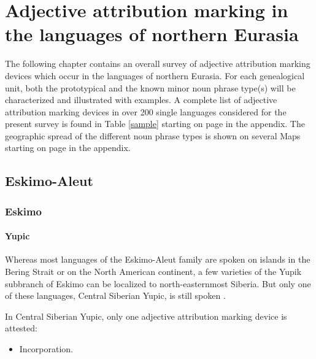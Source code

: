 
\chapter[The languages of northern Eurasia]{Adjective attribution marking in the languages of northern Eurasia}

The following chapter contains an overall survey of adjective attribution marking devices which occur in the languages of northern Eurasia. For each genealogical unit, both the prototypical and the known minor noun phrase type(s) will be characterized and illustrated with examples. A complete list of adjective attribution marking devices in over 200 single languages considered for the present survey is found in Table \ref{sample} starting on page \pageref{sample} in the appendix. The geographic spread of the different noun phrase types is shown on several Maps starting on page \pageref{WorldMap} in the appendix.

\section{Eskimo-Aleut}

\subsection{Eskimo}

\subsubsection{Yupic}
Whereas most languages of the Eskimo-Aleut family are spoken on islands in the Bering Strait or on the North American continent, a few varieties of the Yupik subbranch of Eskimo can be localized to north-easternmost Siberia. But only one of these languages, Central Siberian Yupic, is still spoken \cite[224]{salminen2007}.

In Central Siberian Yupic, only one adjective attribution marking device is attested:
\begin{itemize}
\item Incorporation.
\end{itemize}

